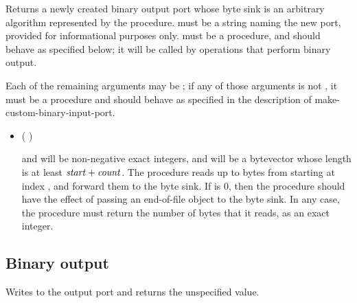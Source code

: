 \begin{entry}{%
}

Returns a newly created binary output port whose byte sink is
an arbitrary algorithm represented by the  procedure.
 must be a string naming the new port,
provided for informational purposes only.
 must be a procedure, and should behave as specified
below; it will be called by operations that perform binary output.

Each of the remaining arguments may be \schfalse{}; if any of
those arguments is not \schfalse{}, it must be a procedure and
should behave as specified in the description of
{\cf make-custom-binary-input-port}.
   
\begin{itemize}
\item {\cf (   )}
       
   and  will be non-negative exact integers,
  and  will be a bytevector whose length is at least
  $\textnormal{\textit{start}} + \textnormal{\textit{count}}$.
  The  procedure reads up to  bytes
  from  starting at index , and forward
  them to the byte sink.
  If  is 0, then the  procedure should
  have the effect of passing an end-of-file object to the byte sink.
  In any case, the  procedure must return the number of
  bytes that it reads, as an exact integer.
\end{itemize}

\end{entry}

\subsection{Binary output}

\begin{entry}{%
}

Writes  to the output port and returns the unspecified value.
\end{entry}

